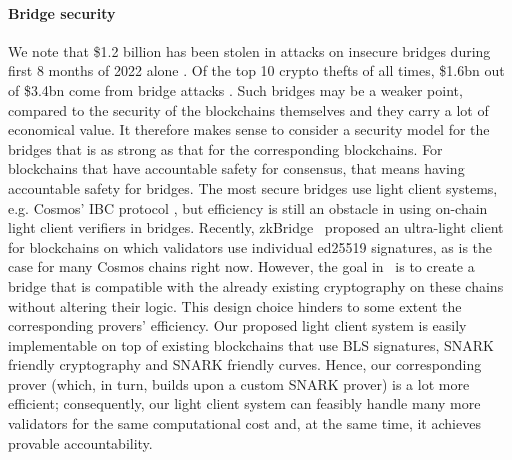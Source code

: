 \paragraph{Bridge security} We note that \$1.2 billion has been stolen in attacks on insecure bridges during first 8 months of 2022 alone \cite{elliptic_harmony,elliptic_nomad}. 
Of the top 10 crypto thefts of all times, \$1.6bn out of \$3.4bn come from bridge attacks \cite{elliptic_nomad}. Such bridges may be a weaker point, 
compared to the security of the blockchains themselves and they carry a lot of economical value. It therefore makes sense to consider a security model for the 
bridges that is as strong as that for the corresponding blockchains. For blockchains that have accountable safety for consensus, that means having accountable safety for bridges. 
The most secure bridges use light client systems, e.g. Cosmos' IBC protocol \cite{IBC_paper}, but efficiency is still an 
obstacle in using on-chain light client verifiers in bridges. Recently, zkBridge~\cite{zkBridge} proposed an ultra-light client for blockchains on which validators use 
individual ed25519 signatures, as is the case for many Cosmos chains right now. However, the goal in~\cite{zkBridge} is to create a bridge that is compatible with 
the already existing cryptography on these chains without altering their logic. This design choice hinders to some extent the corresponding provers' efficiency. 
Our proposed light client system is easily implementable on top of existing blockchains that use BLS signatures, SNARK friendly cryptography and SNARK 
friendly curves. Hence, our corresponding prover (which, in turn, builds upon a custom SNARK prover) is a lot more efficient; consequently, our light client system 
can feasibly handle many more validators for the same computational cost and, at the same time, it achieves provable accountability. 


